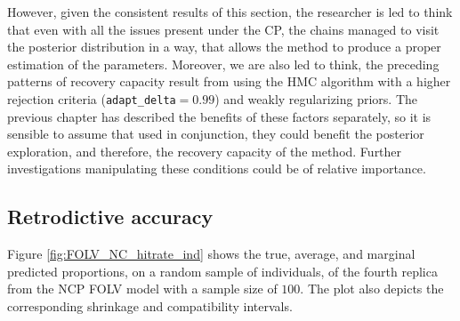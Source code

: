 However, given the consistent results of this section, the researcher is led to think that even with all the issues present under the CP, the chains managed to visit the posterior distribution in a way, that allows the method to produce a proper estimation of the parameters. Moreover, we are also led to think, the preceding patterns of recovery capacity result from using the HMC algorithm with a higher rejection criteria (\texttt{adapt\_delta}$=0.99$) and weakly regularizing priors. The previous chapter has described the benefits of these factors separately, so it is sensible to assume that used in conjunction, they could benefit the posterior exploration, and therefore, the recovery capacity of the method. Further investigations manipulating these conditions could be of relative importance.



\subsection{Retrodictive accuracy}

Figure \ref{fig:FOLV_NC_hitrate_ind} shows the true, average, and marginal predicted proportions, on a random sample of individuals, of the fourth replica from the NCP FOLV model with a sample size of $100$. The plot also depicts the corresponding shrinkage and compatibility intervals. 

